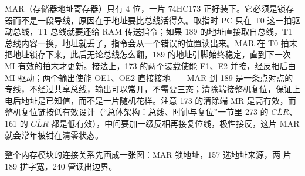 MAR（存储器地址寄存器）只有 4 位，一片 74HC173 正好装下。它必须是锁存器而不是一段导线，原因在于地址要比总线活得久。取指时 PC 只在 T0 这一拍驱动总线，T1 总线就要还给 RAM 传送指令；如果 189 的地址直接取自总线，T1 总线内容一换，地址就丢了，指令会从一个错误的位置读出来。MAR 在 T0 拍末把地址锁存下来，此后无论总线怎么翻，189 的地址引脚始终稳定，直到下一次 MI 有效的拍末才更新。接法上，173 的两个装载使能 E1、E2 并接，经反相后由 MI 驱动；两个输出使能 OE1、OE2 直接接地——MAR 到 189 是一条点对点的专线，不经过共享总线，输出可以常开，不需要三态；清除端接整机复位，保证上电后地址是已知值，而不是一片随机花样。注意 173 的清除端 MR 是高有效，而整机复位链按低有效设计（“总体架构：总线、时钟与复位”一节里 273 的 $\overline{CLR}$、161 的 $\overline{CLR}$ 都是低有效），中间要加一级反相再接复位线，极性接反，这片 MAR 就会常年被钳在清零状态。

整个内存模块的连接关系先画成一张图：MAR 锁地址，157 选地址来源，两
片 189 拼字宽，240 管读出边界。

